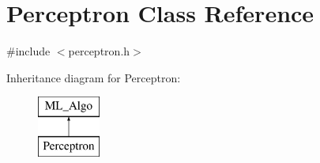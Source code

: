 \hypertarget{classPerceptron}{}\section{Perceptron Class Reference}
\label{classPerceptron}


{\ttfamily \#include $<$perceptron.\+h$>$}

Inheritance diagram for Perceptron\+:\begin{figure}[H]
\begin{center}
\leavevmode
\includegraphics[height=2.000000cm]{classPerceptron}
\end{center}
\end{figure}
